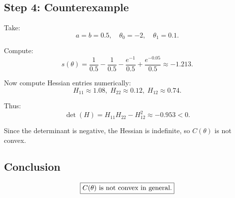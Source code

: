 \documentclass[12pt]{article}
\begin{document}
\subsection*{Step 4: Counterexample}
Take:
\[
a = b = 0.5,\quad \theta_0 = -2,\quad \theta_1 = 0.1.
\]

Compute:
\[
s(\theta) = \frac{1}{0.5} - \frac{1}{0.5} - \frac{e^{-1}}{0.5} + \frac{e^{-0.05}}{0.5}
\approx - 1.213.
\]

Now compute Hessian entries numerically:
\[
H_{11} \approx 1.08,\;
H_{22} \approx 0.12,\;
H_{12} \approx 0.74.
\]

Thus:
\[
\det(H) = H_{11} H_{22} - H_{12}^2 \approx -0.953 < 0.
\]

Since the determinant is negative, the Hessian is indefinite, so \(C(\theta)\) is not convex.

\subsection*{Conclusion}
\[
\boxed{\text{\( C(\theta) \) is not convex in general.}}
\]
\end{document}
